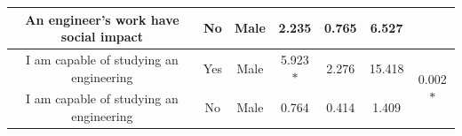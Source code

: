 \documentclass[journal,transmag]{IEEEtran}
\begin{document}
\begin{table}
\begin{center}
\begin{tabular}{|c|c|c|c|c|c|c|}
		An engineer’s work have social impact   & No     & Male   & 2.235    & 0.765      & 6.527      &                              \\ \hline
		I am capable of studying an engineering & Yes    & Male   & 5.923$*$ & 2.276      & 15.418     & \multirow{2}{*}{0.002$*$}    \\ \cline{1-6}
		I am capable of studying an engineering & No     & Male   & 0.764    & 0.414      & 1.409      &                              \\ \hline
		\end{tabular}
	\end{center}
\end{table}

%
\end{document}
